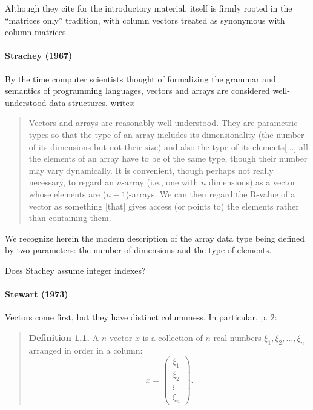 Although they cite \cite{Faddeev1959} for the introductory material, \cite{Faddeev1959} itself is firmly rooted in the ``matrices only'' tradition, with column vectors treated as synonymous with column matrices.



\paragraph{Strachey (1967)~\cite{Strachey1967}}

By the time computer scientists thought of formalizing the grammar and semantics of programming languages,
vectors and arrays are considered well-understood data structures. \cite[\S 3.7.7, pp. 43--44]{Strachey1967} writes:
\begin{quote}
Vectors and arrays are reasonably well understood. They are parametric types so that the type of an array includes its dimensionality (the number of
its dimensions but not their size) and also the type of its elements[...]
all the elements of an array have to be of the same type, though their number may vary dynamically.
It is convenient, though perhaps not really necessary, to regard an $n$-array
(i.e., one with $n$ dimensions) as a vector whose elements are ($n-1$)-arrays.
We can then regard the R-value of a vector as something [that] gives access (or points to) the elements rather than containing them.
\end{quote}
We recognize herein the modern description of the array data type being defined by
two parameters: the number of dimensions and the type of elements.

Does Stachey assume integer indexes?


\paragraph{Stewart (1973)~\cite{Stewart1973}}

Vectors come first, but they have distinct columnness. In particular, p. 2:

\begin{quote}
    \textbf{Definition 1.1.} A $n$-vector $x$ is a collection of $n$ real numbers
    $\xi_1, \xi_2, \dots, \xi_n$ arranged in order in a column:
    \[
        x = \begin{pmatrix}\xi_1\\\xi_2\\\vdots\\\xi_n\end{pmatrix}.
    \]
\end{quote}

